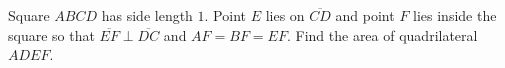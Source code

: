 Square $ABCD$ has side length $1$. Point $E$ lies on $\overline{CD}$ and point $F$ lies inside the square so that $\overline{EF}\perp\overline{DC}$ and $AF=BF=EF$. Find the area of quadrilateral $ADEF$.
